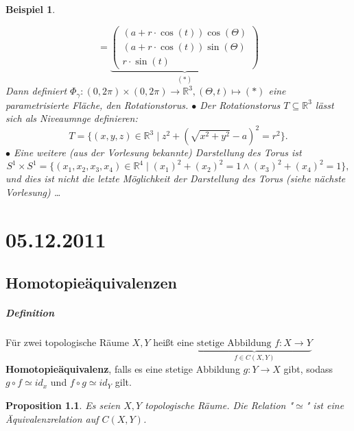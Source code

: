 \documentclass[a4paper,11pt,notitlepage]{report}
\newtheorem{proposition}{Proposition}[chapter]
\newtheorem{example}{Beispiel}[chapter]
\newcommand{\R}{{\ensuremath{\mathbb{R}}}}
\begin{document}
\begin{example}
\begin{enumerate}
	$$= \underbrace{\begin{pmatrix}
	(a + r \cdot \cos{(t)})  \cos{(\Theta)} \\ (a + r \cdot \cos{(t)})  \sin{(\Theta)} \\ r \cdot \sin{(t)}
	\end{pmatrix} }_{(*)}$$
	Dann definiert $\Phi_\gamma \colon (0, 2\pi) \times (0, 2 \pi) \rightarrow \R^3, (\Theta, t) \mapsto (*)$
	eine parametrisierte Fläche, den Rotationstorus.
	\newline
	$\bullet$ Der Rotationstorus $T \subseteq \R^3$ lässt sich als Niveaumnge definieren: 
	$$T = \{(x,y,z) \in \R^3 \mid z^2 + (\sqrt{x^2+y^2}-a)^2 = r^2\}.$$
	$\bullet$ Eine weitere (aus der Vorlesung bekannte) Darstellung des Torus ist
	$$S^1 \times S^1 = \{(x_1,x_2,x_3,x_4) \in \R^4 \mid (x_1)^2 + (x_2)^2 = 1 \wedge (x_3)^2 + (x_4)^2 = 1 \},$$
	und dies ist nicht die letzte Möglichkeit der Darstellung des Torus (siehe nächste Vorlesung) \ldots 
	\end{enumerate}
\end{example}

\chapter{05.12.2011}
\section{Homotopieäquivalenzen}
\paragraph{Definition}
Für zwei topologische Räume $X,Y$ heißt eine $\underbrace{\text{stetige Abbildung }f \colon X \rightarrow Y}_{f \in C(X,Y)}$ \textbf{Homotopieäquivalenz}, falls es eine stetige Abbildung $g \colon Y \rightarrow X$ gibt, sodass $g \circ f \simeq id_x$ und $f \circ g \simeq id_Y$ gilt.

\begin{proposition}
	Es seien $X,Y$ topologische Räume. Die Relation "$\simeq$" ist eine Äquivalenzrelation auf $C(X,Y)$.
\end{proposition}
\end{document}
